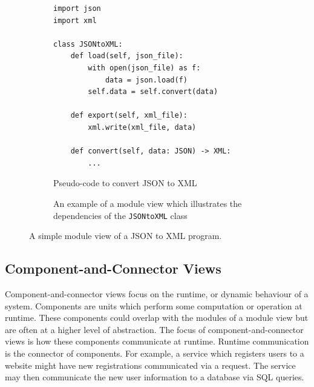 \begin{figure}[ht]
\centering
\begin{subfigure}[b]{\textwidth}
\begin{shaded}
\begin{lstlisting}[style=python]
import json
import xml

class JSONtoXML:
    def load(self, json_file):
        with open(json_file) as f:
            data = json.load(f)
        self.data = self.convert(data)

    def export(self, xml_file):
        xml.write(xml_file, data)

    def convert(self, data: JSON) -> XML:
        ...
\end{lstlisting}
\end{shaded}
\caption{Pseudo-code to convert JSON to XML}
\end{subfigure}


\begin{subfigure}[b]{\textwidth}
\begin{center}
\end{center}
\caption{An example of a module view which illustrates the dependencies of the \texttt{JSONtoXML} class}
\end{subfigure}
\caption{A simple module view of a JSON to XML program.}
\end{figure}

\subsection{Component-and-Connector Views}
Component-and-connector views focus on the runtime, or dynamic behaviour of a system.
Components are units which perform some computation or operation at runtime.
These components could overlap with the modules of a module view but are often at a higher level of abstraction.
The focus of component-and-connector views is how these components communicate at runtime.
Runtime communication is the connector of components.
For example, a service which registers users to a website might have new registrations communicated via a  request.
The service may then communicate the new user information to a database via SQL queries.

